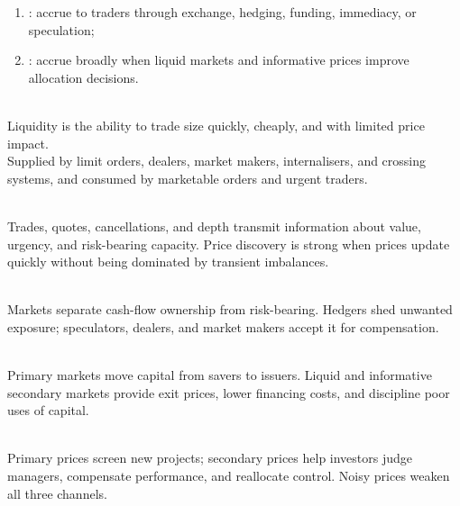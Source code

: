 \documentclass[a4paper,oneside,openany]{book}
\begin{document}
\begin{taxonomy} 
\begin{enumerate}[label=\roman*.]
\setlength{\itemsep}{0pt}
\item {}: accrue to traders through exchange, hedging, funding, immediacy, or speculation;
\item {}: accrue broadly when liquid markets and informative prices improve allocation decisions.
\end{enumerate}
\end{taxonomy}

\begin{definition} \\
Liquidity is the ability to trade size quickly, cheaply, and with limited price impact.\\
Supplied by limit orders, dealers, market makers, internalisers, and crossing systems, and consumed by marketable orders and urgent traders.
\end{definition}

\begin{mechanism} \\
Trades, quotes, cancellations, and depth transmit information about value, urgency, and risk-bearing capacity. Price discovery is strong when prices update quickly without being dominated by transient imbalances.
\end{mechanism}

\begin{mechanism} \\
Markets separate cash-flow ownership from risk-bearing. Hedgers shed unwanted exposure; speculators, dealers, and market makers accept it for compensation.
\end{mechanism}

\begin{principle} \\
Primary markets move capital from savers to issuers. Liquid and informative secondary markets provide exit prices, lower financing costs, and discipline poor uses of capital.
\end{principle}

\begin{mechanism} \\
Primary prices screen new projects; secondary prices help investors judge managers, compensate performance, and reallocate control. Noisy prices weaken all three channels.
\end{mechanism}
\end{document}

